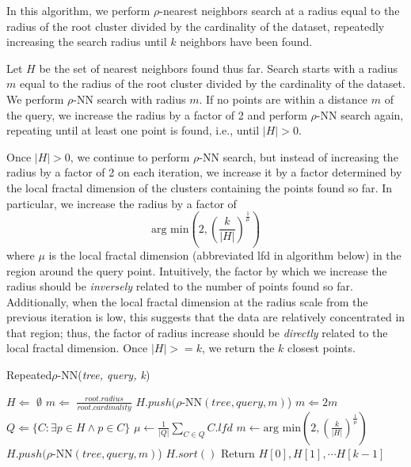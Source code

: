 In this algorithm, we perform $\rho$-nearest neighbors search at a radius equal to the radius of the root cluster divided by
the cardinality of the dataset, repeatedly increasing the search radius until $k$ neighbors
have been found.

Let $H$ be the set of nearest neighbors found thus far.
Search starts with a radius $m$ equal to the radius of the root cluster divided by
the cardinality of the dataset. We perform $\rho$-NN search with radius $m$. 
If no points are within a distance $m$ of the query, we increase the radius by a factor of 
2 and perform $\rho$-NN search again, repeating until at least one point is found, i.e., 
until $|H| > 0$.


Once $|H| > 0$, we continue to perform $\rho$-NN search, but instead of 
increasing the radius by a factor of 2 on each iteration, we increase it by a factor determined 
by the local fractal dimension of the clusters containing the points found so far. In particular, 
we increase the radius by a factor of 
\begin{equation} \text{arg min}\left(2, \left({\frac{k}{|H|}}\right)^{\frac{1}{\mu}}\right) \label{2} \end{equation}
where $\mu$ is the local fractal dimension (abbreviated lfd in algorithm below) in the region around the query point.
Intuitively, the factor by which we increase the radius should be \emph{inversely} related to the number of points found so far. 
Additionally, when the local fractal dimension at the radius scale from the previous iteration is low, this suggests that the data 
are relatively concentrated in that region; thus, the factor of radius increase should be \emph{directly} related to the 
local fractal dimension. Once $|H| >= k$, we return the $k$ closest points.

\begin{algorithm} %
    \caption{Repeated$\rho$-NN(\emph{tree, query, k})} %
    \label{alg:knn-by-rnn} %
    \begin{algorithmic}[4] %
        \STATE $H \Leftarrow$ $\emptyset$
        \STATE $m \Leftarrow$ $\frac{root.radius}{root.cardinality}$
            \STATE $H.push(\rho$-NN$(tree, query, m)$)
            \STATE $m \Leftarrow 2m$
        \ENDWHILE
            \STATE $Q \Leftarrow \{ C: \exists p \in H \land p \in C \}$
            \STATE $\mu \leftarrow \frac{1}{|Q|} \sum_{C \in Q} C.lfd$
            \STATE $m \leftarrow \text{arg min}\left(2, \left({\frac{k}{|H|}}\right)^{\frac{1}{\mu}}\right)$
            \STATE $H.push(\rho$-NN$(tree, query, m)$)
        \ENDWHILE
        \STATE $H.sort()$
        \STATE Return $H[0], H[1], \cdots H[k-1]$
    \end{algorithmic}
    \end{algorithm}


